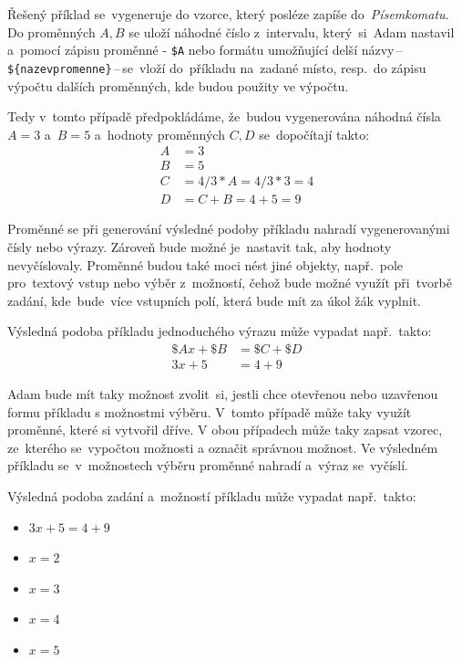 \documentclass[14pt,a4paper]{article}
\begin{document}
        Řešený příklad se~vygeneruje do vzorce, který posléze zapíše do~\emph{Písemkomatu}. Do proměnných $A, B$ se uloží náhodné číslo
        z~intervalu, který~si~Adam nastavil a~pomocí zápisu proměnné - \texttt{\$A} nebo formátu umožňující
        delší názvy\,--\,\texttt{\$\{nazevpromenne\}}\,--\,se~vloží do~příkladu na~zadané místo, resp.~do zápisu výpočtu dalších proměnných,
        kde budou použity ve výpočtu.
        
        Tedy v~tomto případě předpokládáme, že~budou vygenerována náhodná čísla $A = 3$ a~$B = 5$
        a~hodnoty proměnných $C, D$ se~dopočítají takto:
        \begin{align*}
            A &= 3 \\
            B &= 5 \\
            C &= 4/3*A = 4/3*3 = 4 \\
            D &= C + B = 4 + 5 = 9
        \end{align*}

        Proměnné se při generování výsledné podoby příkladu nahradí vygenerovanými čísly nebo výrazy.
        Zároveň bude možné je~nastavit tak, aby hodnoty nevyčíslovaly. Proměnné budou také moci nést jiné objekty, např.~pole pro~textový vstup
        nebo výběr z~možností, čehož bude možné využít při~tvorbě zadání, kde~bude~více vstupních polí, která bude mít za úkol žák vyplnit.

        Výsledná podoba příkladu jednoduchého výrazu může vypadat např.~takto:
        \begin{align*}
            \$Ax + \$B &= \$C + \$D \\
            3x + 5 &= 4 + 9
        \end{align*}

        Adam bude mít taky možnost zvolit~si, jestli chce otevřenou nebo uzavřenou formu příkladu s možnostmi výběru.
        V~tomto případě může taky využít proměnné, které si vytvořil dříve. V obou případech může taky zapsat vzorec,
        ze~kterého se~vypočtou možnosti a označit správnou možnost.
        Ve výsledném příkladu se~v~možnostech výběru proměnné nahradí a~výraz se~vyčíslí.

        Výsledná podoba zadání a~možností příkladu může vypadat např.~takto:
        \begin{itemize}
            \item $3x + 5 = 4 + 9$
            \item $x = 2$
            \item $x = 3$
            \item $x = 4$
            \item $x = 5$
        \end{itemize}
\end{document}
